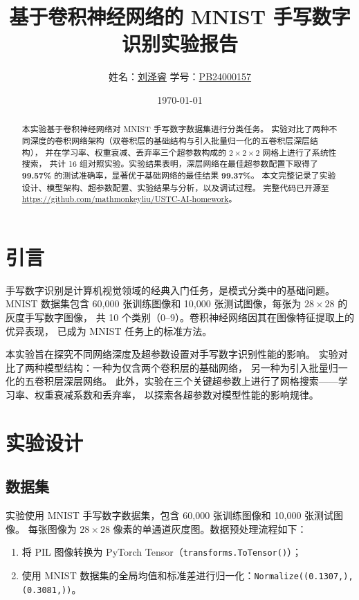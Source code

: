\documentclass[UTF8,a4paper,12pt]{ctexart}
\title{基于卷积神经网络的 MNIST 手写数字识别实验报告}
\author{姓名：\underline{刘泽睿} \quad 学号：\underline{PB24000157}}
\date{\today}
\begin{document}
\maketitle

\begin{abstract}
本实验基于卷积神经网络对 MNIST 手写数字数据集进行分类任务。
实验对比了两种不同深度的卷积网络架构（双卷积层的基础结构与引入批量归一化的五卷积层深层结构），
并在学习率、权重衰减、丢弃率三个超参数构成的 $2\times2\times2$ 网格上进行了系统性搜索，
共计 16 组对照实验。实验结果表明，深层网络在最佳超参数配置下取得了
\textbf{99.57\%} 的测试准确率，显著优于基础网络的最佳结果 \textbf{99.37\%}。
本文完整记录了实验设计、模型架构、超参数配置、实验结果与分析，以及调试过程。
完整代码已开源至 \url{https://github.com/mathmonkeyliu/USTC-AI-homework}。
\end{abstract}

\tableofcontents

\section{引言}

手写数字识别是计算机视觉领域的经典入门任务，是模式分类中的基础问题。
MNIST 数据集包含 60,000 张训练图像和 10,000 张测试图像，每张为 $28\times28$ 的灰度手写数字图像，
共 10 个类别（0--9）。卷积神经网络因其在图像特征提取上的优异表现，
已成为 MNIST 任务上的标准方法。

本实验旨在探究不同网络深度及超参数设置对手写数字识别性能的影响。
实验对比了两种模型结构：一种为仅含两个卷积层的基础网络，
另一种为引入批量归一化的五卷积层深层网络。
此外，实验在三个关键超参数上进行了网格搜索——学习率、权重衰减系数和丢弃率，
以探索各超参数对模型性能的影响规律。

\section{实验设计}

\subsection{数据集}

实验使用 MNIST 手写数字数据集，包含 60,000 张训练图像和 10,000 张测试图像。
每张图像为 $28\times28$ 像素的单通道灰度图。数据预处理流程如下：
\begin{enumerate}
    \item 将 PIL 图像转换为 PyTorch Tensor（\texttt{transforms.ToTensor()}）；
    \item 使用 MNIST 数据集的全局均值和标准差进行归一化：\texttt{Normalize((0.1307,), (0.3081,))}。
\end{enumerate}
\end{document}
